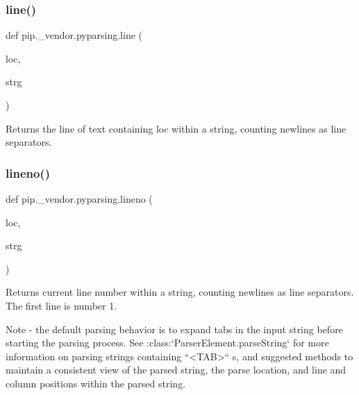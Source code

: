 \subsubsection{\texorpdfstring{line()}{line()}}
{\footnotesize\ttfamily def pip.\+\_\+vendor.\+pyparsing.\+line (\begin{DoxyParamCaption}\item[{}]{loc,  }\item[{}]{strg }\end{DoxyParamCaption})}

\begin{DoxyVerb}Returns the line of text containing loc within a string, counting newlines as line separators.\end{DoxyVerb}
 \mbox{\label{namespacepip_1_1__vendor_1_1pyparsing_a3d1206ac2f1a6527c6e08b2aaf9014d4}} 
\subsubsection{\texorpdfstring{lineno()}{lineno()}}
{\footnotesize\ttfamily def pip.\+\_\+vendor.\+pyparsing.\+lineno (\begin{DoxyParamCaption}\item[{}]{loc,  }\item[{}]{strg }\end{DoxyParamCaption})}

\begin{DoxyVerb}Returns current line number within a string, counting newlines as line separators.
The first line is number 1.

Note - the default parsing behavior is to expand tabs in the input string
before starting the parsing process.  See :class:`ParserElement.parseString`
for more information on parsing strings containing ``<TAB>`` s, and
suggested methods to maintain a consistent view of the parsed string, the
parse location, and line and column positions within the parsed string.
\end{DoxyVerb}
 \mbox{\label{namespacepip_1_1__vendor_1_1pyparsing_a99b73f3740b470766d4ae992b5e131de}} 
